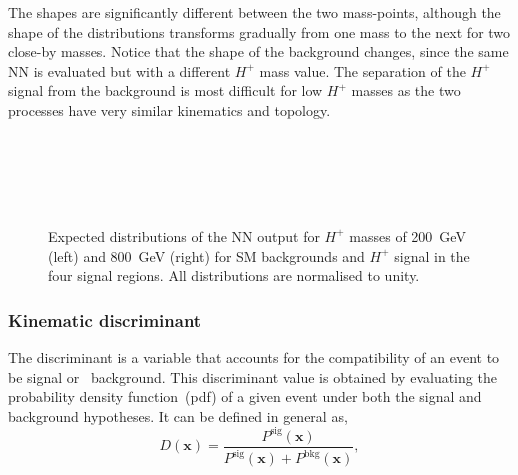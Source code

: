 The shapes are significantly different between the two mass-points, although the shape of the distributions transforms gradually from one mass to the next for two close-by masses. Notice that the shape of the background changes, since the same NN is evaluated but with a different $H^+$ mass value. The separation of the $H^+$ signal from the background is most difficult for low $H^+$ masses as the two processes have very similar kinematics and topology.

\begin{figure}[htb]
    \RawFloats
    \centering
    \\
     \\
     \\
     \\

    \caption{Expected distributions of the NN output for $H^+$ masses of 200~GeV (left)
    and 800~GeV (right) for SM backgrounds and $H^+$ signal in the four signal regions.
    All distributions are normalised to unity.
    }
    \label{Hplustb:NNshapes}
\end{figure}
\clearpage
\subsubsection{Kinematic discriminant}
\label{Hplustb:SectionHplusDiscriminant}

The discriminant is a variable that accounts for the compatibility of an event to be signal or \ttbar\ background. This discriminant value is obtained by evaluating the probability density function~(pdf) of a given event under both the signal and background hypotheses. It can be defined in general as,
\begin{equation}
    D(\textbf{x})=\frac{P^{\text{sig}}(\textbf{x})}{P^{\text{sig}}(\textbf{x})+P^{\text{bkg}}(\textbf{x})},
    \label{eq3:discriminant}
\end{equation}

